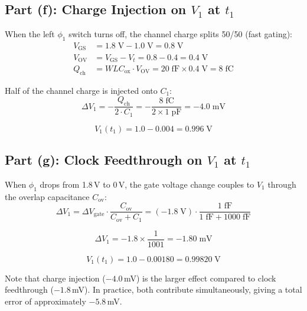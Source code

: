 \documentclass{article}
\begin{document}
\subsection{Part (f): Charge Injection on $V_1$ at $t_1$}

When the left $\phi_1$ switch turns off, the channel charge splits 50/50 (fast gating):
\begin{align}
    V_\text{GS} &= 1.8\;\text{V} - 1.0\;\text{V} = 0.8\;\text{V} \\
    V_\text{OV} &= V_\text{GS} - V_t = 0.8 - 0.4 = 0.4\;\text{V} \\
    Q_\text{ch} &= WLC_\text{ox} \cdot V_\text{OV} = 20\;\text{fF} \times 0.4\;\text{V} = 8\;\text{fC}
\end{align}

Half of the channel charge is injected onto $C_1$:
\begin{equation}
    \Delta V_1 = -\frac{Q_\text{ch}}{2 \cdot C_1} = -\frac{8\;\text{fC}}{2 \times 1\;\text{pF}} = -4.0\;\text{mV}
\end{equation}

\begin{equation}
    \boxed{V_1(t_1) = 1.0 - 0.004 = 0.996\;\text{V}}
\end{equation}

\subsection{Part (g): Clock Feedthrough on $V_1$ at $t_1$}

When $\phi_1$ drops from 1.8\,V to 0\,V, the gate voltage change couples to $V_1$ through the overlap capacitance $C_\text{ov}$:
\begin{equation}
    \Delta V_1 = \Delta V_\text{gate} \cdot \frac{C_\text{ov}}{C_\text{ov} + C_1} = (-1.8\;\text{V}) \cdot \frac{1\;\text{fF}}{1\;\text{fF} + 1000\;\text{fF}}
\end{equation}

\begin{equation}
    \Delta V_1 = -1.8 \times \frac{1}{1001} = -1.80\;\text{mV}
\end{equation}

\begin{equation}
    \boxed{V_1(t_1) = 1.0 - 0.00180 = 0.99820\;\text{V}}
\end{equation}

Note that charge injection ($-4.0$\,mV) is the larger effect compared to clock feedthrough ($-1.8$\,mV). In practice, both contribute simultaneously, giving a total error of approximately $-5.8$\,mV.
\end{document}
